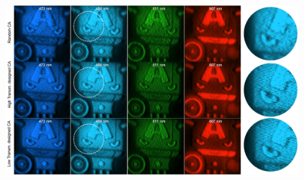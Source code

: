 \documentclass{beamer}
\begin{document}
\begin{frame}

\begin{figure}
\includegraphics[scale=0.25]{FiguresUpd/real_all.png}
\end{figure}
\begin{center}
\end{center}
\end{frame}




%
%
%
\end{document}

